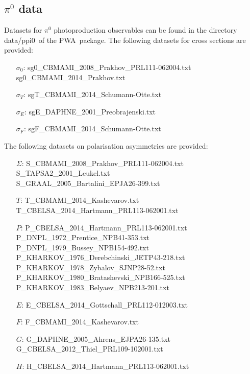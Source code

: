 \documentclass[a4paper,10pt]{article}
\def\PWA{\ttfamily PWA\rmfamily\ }
\def\tt{\ttfamily}
\def\rm{\rmfamily}
\begin{document}
\subsection{$\pi^0$ data}
Datasets for $\pi^0$ photoproduction observables can be found in the directory 
\tt data/ppi0\rm\ of the \PWA package. The following datasets for cross sections are provided:
\begin{itemize}
\item[$\sigma_0$:\:]
\tt sg0\_CBMAMI\_2008\_Prakhov\_PRL111-062004.txt\rm \\
\tt sg0\_CBMAMI\_2014\_Prakhov.txt\rm

\item[$\sigma_T$:\:]
\tt sgT\_CBMAMI\_2014\_Schumann-Otte.txt\rm

\item[$\sigma_E$:\:]
\tt sgE\_DAPHNE\_2001\_Preobrajenski.txt\rm

\item[$\sigma_F$:\:]
\tt sgF\_CBMAMI\_2014\_Schumann-Otte.txt\rm
\end{itemize}
The following datasets on polarisation asymmetries are provided:
\begin{itemize}
\item[$\Sigma$:\:]
\tt S\_CBMAMI\_2008\_Prakhov\_PRL111-062004.txt\rm \\
\tt S\_TAPSA2\_2001\_Leukel.txt\rm \\
\tt S\_GRAAL\_2005\_Bartalini\_EPJA26-399.txt\rm

\item[$T$:\:]
\tt T\_CBMAMI\_2014\_Kashevarov.txt\rm \\
\tt T\_CBELSA\_2014\_Hartmann\_PRL113-062001.txt\rm

\item[$P$:\:]
\tt P\_CBELSA\_2014\_Hartmann\_PRL113-062001.txt\rm \\
\tt P\_DNPL\_1972\_Prentice\_NPB41-353.txt\rm \\
\tt P\_DNPL\_1979\_Bussey\_NPB154-492.txt\rm \\
\tt P\_KHARKOV\_1976\_Derebchinski\_JETP43-218.txt\rm \\
\tt P\_KHARKOV\_1978\_Zybalov\_SJNP28-52.txt\rm \\
\tt P\_KHARKOV\_1980\_Bratashevski\_NPB166-525.txt\rm \\
\tt P\_KHARKOV\_1983\_Belyaev\_NPB213-201.txt\rm

\item[$E$:\:]
\tt E\_CBELSA\_2014\_Gottschall\_PRL112-012003.txt\rm

\item[$F$:\:]
\tt F\_CBMAMI\_2014\_Kashevarov.txt\rm

\item[$G$:\:]
\tt G\_DAPHNE\_2005\_Ahrens\_EJPA26-135.txt\rm \\
\tt G\_CBELSA\_2012\_Thiel\_PRL109-102001.txt\rm

\item[$H$:\:]
\tt H\_CBELSA\_2014\_Hartmann\_PRL113-062001.txt\rm
\end{itemize}
\end{document}
